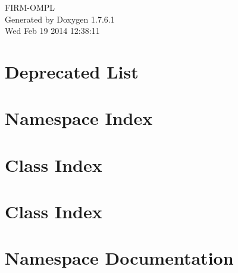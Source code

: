 \documentclass[a4paper]{book}
\begin{document}
\hypersetup{pageanchor=false,citecolor=blue}
\begin{titlepage}
\vspace*{7cm}
\begin{center}
{\Large \-F\-I\-R\-M-\/\-O\-M\-P\-L }\\
\vspace*{1cm}
{\large \-Generated by Doxygen 1.7.6.1}\\
\vspace*{0.5cm}
{\small Wed Feb 19 2014 12:38:11}\\
\end{center}
\end{titlepage}
\clearemptydoublepage
{}
\tableofcontents
\clearemptydoublepage
{}
\hypersetup{pageanchor=true,citecolor=blue}
\chapter{\-Deprecated \-List}
\label{deprecated}
\hypertarget{deprecated}{}

\chapter{\-Namespace \-Index}

\chapter{\-Class \-Index}

\chapter{\-Class \-Index}

\chapter{\-Namespace \-Documentation}

\end{document}
